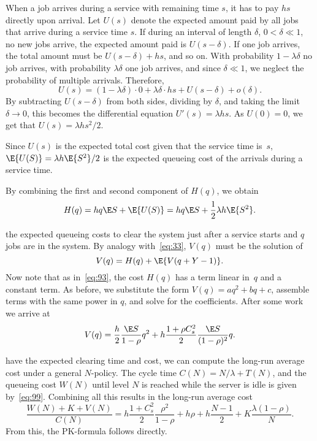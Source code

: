When a job arrives during a service with remaining time $s$, it has to pay $h s$ directly upon arrival.
Let $U(s)$ denote the expected amount paid by all jobs that arrive during a service time $s$.
If during an interval of length $\delta$, $0<\delta\ll 1$, no new jobs arrive, the expected amount paid is $U(s-\delta)$.
If one job arrives, the total amount must be $U(s-\delta) + hs$, and so on.
With probability $1-\lambda \delta$ no job arrives, with probability $\lambda \delta$ one job arrives, and since $\delta\ll 1$, we neglect the probability of multiple arrivals.
Therefore,
\begin{equation*}
  U(s) =  (1-\lambda \delta)\cdot 0 + \lambda \delta \cdot h s + U(s-\delta) + o(\delta).
\end{equation*}
By subtracting $U(s-\delta)$ from both sides, dividing by $\delta$, and taking the limit $\delta \to 0$, this becomes the differential equation $U'(s) = \lambda  h s$. As $U(0)=0$,  we get that $U(s)= \lambda h s^2/2$.

Since $U(s)$ is the expected total cost given that the service time is~$s$, $\E{U(S)} = \lambda h \E{S^2}/2$ is the expected queueing cost of the arrivals during a service time.

By combining the first and second component of $H(q)$, we obtain
\begin{equation*}
  H(q) = h q \E S + \E{U(S)} = h q \E S + \frac 12 \lambda h \E{S^2}.
\end{equation*}


 the expected queueing costs to clear the system just after a service starts and  $q$ jobs are in the system.
By analogy with~\cref{eq:33}, $V(q)$ must be the solution of
\begin{equation}  \label{eq:98}
  V(q) = H(q) + \E{V(q+Y-1)}.
\end{equation}
Now note that as in~\cref{eq:93}, the cost $H(q)$ has a term linear in~$q$ and a constant term.
As before, we substitute the form $V(q) = aq^2 + bq+c$, assemble terms with the same power in $q$, and solve for the coefficients.
After some work we arrive at
\begin{align*}
  V(q) = \frac{h}{2}\frac{\E S}{1-\rho} q^2 + h  \frac{ 1+ \rho C_s^2}2 \frac{\E S}{(1-\rho)^2} q.
\end{align*}

 have the expected clearing time and cost, we can compute the long-run average cost under a general $N$-policy.
The cycle time $C(N) = N/\lambda + T(N)$, and the queueing cost $W(N)$ until level $N$ is reached while the server is idle is given by~\cref{eq:99}.
Combining all this results in the long-run average cost
\begin{equation}  \label{eq:100}
    \frac{W(N) + K + V(N)}{C(N)}
    = h \frac{1+ C_s^2}2 \frac{\rho^2}{1-\rho} + h \rho + h \frac{N-1}2 + K \frac{\lambda(1-\rho)}N.
\end{equation}
From this, the PK-formula follows directly.

